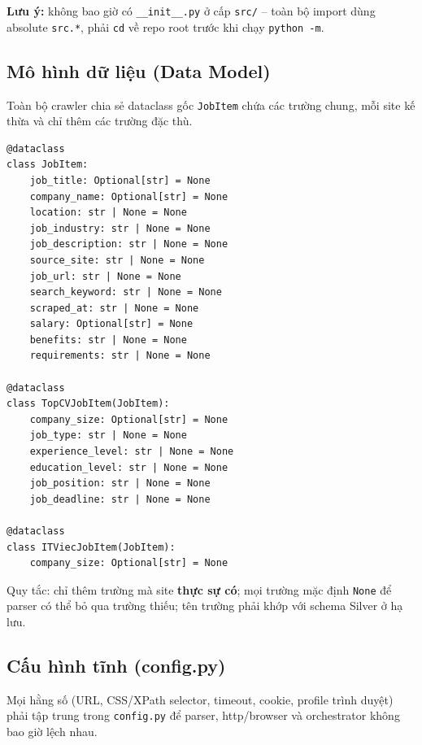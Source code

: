 \textbf{Lưu ý:} không bao giờ có \texttt{\_\_init\_\_.py} ở cấp \texttt{src/} --
toàn bộ import dùng absolute \texttt{src.*}, phải \texttt{cd} về repo root trước
khi chạy \texttt{python -m}.


\subsection{Mô hình dữ liệu (Data Model)}
\label{subsec:crawl-datamodel}

Toàn bộ crawler chia sẻ dataclass gốc \texttt{JobItem} chứa các trường chung,
mỗi site kế thừa và chỉ thêm các trường đặc thù.

\begin{lstlisting}[caption={Dataclass gốc JobItem và các subclass per-site (src/crawl\_layer/data\_model/data\_class.py)},label={lst:jobitem}]
@dataclass
class JobItem:
    job_title: Optional[str] = None
    company_name: Optional[str] = None
    location: str | None = None
    job_industry: str | None = None
    job_description: str | None = None
    source_site: str | None = None
    job_url: str | None = None
    search_keyword: str | None = None
    scraped_at: str | None = None
    salary: Optional[str] = None
    benefits: str | None = None
    requirements: str | None = None

@dataclass
class TopCVJobItem(JobItem):
    company_size: Optional[str] = None
    job_type: str | None = None
    experience_level: str | None = None
    education_level: str | None = None
    job_position: str | None = None
    job_deadline: str | None = None

@dataclass
class ITViecJobItem(JobItem):
    company_size: Optional[str] = None
\end{lstlisting}

Quy tắc: chỉ thêm trường mà site \textbf{thực sự có}; mọi trường mặc định
\texttt{None} để parser có thể bỏ qua trường thiếu; tên trường phải khớp với
schema Silver ở hạ lưu.


\subsection{Cấu hình tĩnh (config.py)}
\label{subsec:crawl-config}

Mọi hằng số (URL, CSS/XPath selector, timeout, cookie, profile trình duyệt)
phải tập trung trong \texttt{config.py} để parser, http/browser và orchestrator
không bao giờ lệch nhau.

